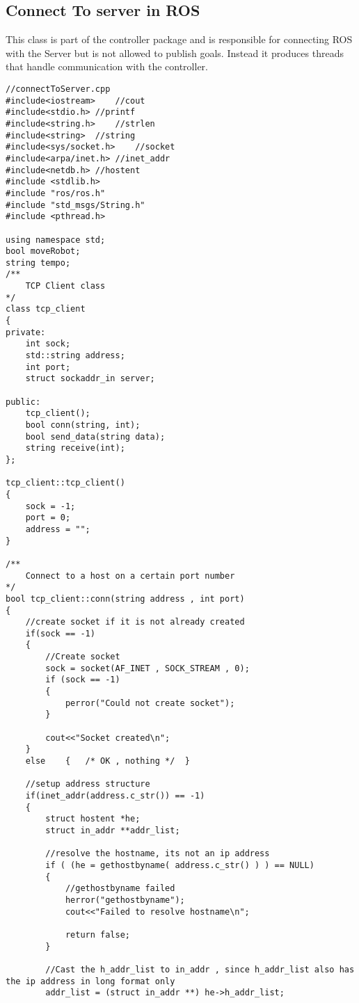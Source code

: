 \subsection{Connect To server in ROS}
This class is part of the controller package and is responsible for connecting ROS with the Server but is not allowed to publish goals. Instead it produces threads that handle communication with the controller.
\begin{lstlisting}
//connectToServer.cpp
#include<iostream>    //cout
#include<stdio.h> //printf
#include<string.h>    //strlen
#include<string>  //string
#include<sys/socket.h>    //socket
#include<arpa/inet.h> //inet_addr
#include<netdb.h> //hostent
#include <stdlib.h>
#include "ros/ros.h"
#include "std_msgs/String.h"
#include <pthread.h>

using namespace std;
bool moveRobot;
string tempo;
/**
    TCP Client class
*/
class tcp_client
{
private:
    int sock;
    std::string address;
    int port;
    struct sockaddr_in server;
     
public:
    tcp_client();
    bool conn(string, int);
    bool send_data(string data);
    string receive(int);
};
 
tcp_client::tcp_client()
{
    sock = -1;
    port = 0;
    address = "";
}
 
/**
    Connect to a host on a certain port number
*/
bool tcp_client::conn(string address , int port)
{
    //create socket if it is not already created
    if(sock == -1)
    {
        //Create socket
        sock = socket(AF_INET , SOCK_STREAM , 0);
        if (sock == -1)
        {
            perror("Could not create socket");
        }
         
        cout<<"Socket created\n";
    }
    else    {   /* OK , nothing */  }
     
    //setup address structure
    if(inet_addr(address.c_str()) == -1)
    {
        struct hostent *he;
        struct in_addr **addr_list;
         
        //resolve the hostname, its not an ip address
        if ( (he = gethostbyname( address.c_str() ) ) == NULL)
        {
            //gethostbyname failed
            herror("gethostbyname");
            cout<<"Failed to resolve hostname\n";
             
            return false;
        }
         
        //Cast the h_addr_list to in_addr , since h_addr_list also has the ip address in long format only
        addr_list = (struct in_addr **) he->h_addr_list;
 

\end{lstlisting}
